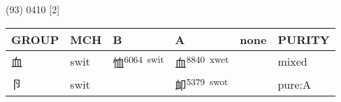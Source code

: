 \documentclass[14pt,a4paper]{scrartcl}
\begin{document}
(93) 0410 {[}2{]}

\begin{longtable}[c]{@{}llllll@{}}
\toprule
\begin{minipage}[b]{0.14\columnwidth}\raggedright\strut
GROUP
\strut\end{minipage} &
\begin{minipage}[b]{0.14\columnwidth}\raggedright\strut
MCH
\strut\end{minipage} &
\begin{minipage}[b]{0.14\columnwidth}\raggedright\strut
B
\strut\end{minipage} &
\begin{minipage}[b]{0.14\columnwidth}\raggedright\strut
A
\strut\end{minipage} &
\begin{minipage}[b]{0.14\columnwidth}\raggedright\strut
none
\strut\end{minipage} &
\begin{minipage}[b]{0.14\columnwidth}\raggedright\strut
PURITY
\strut\end{minipage}\tabularnewline
\midrule
\endhead
\begin{minipage}[t]{0.14\columnwidth}\raggedright\strut
血
\strut\end{minipage} &
\begin{minipage}[t]{0.14\columnwidth}\raggedright\strut
swit
\strut\end{minipage} &
\begin{minipage}[t]{0.14\columnwidth}\raggedright\strut
恤\textsuperscript{6064~swit}
\strut\end{minipage} &
\begin{minipage}[t]{0.14\columnwidth}\raggedright\strut
血\textsuperscript{8840~xwet}
\strut\end{minipage} &
\begin{minipage}[t]{0.14\columnwidth}\raggedright\strut
\strut\end{minipage} &
\begin{minipage}[t]{0.14\columnwidth}\raggedright\strut
mixed
\strut\end{minipage}\tabularnewline
\begin{minipage}[t]{0.14\columnwidth}\raggedright\strut
卪
\strut\end{minipage} &
\begin{minipage}[t]{0.14\columnwidth}\raggedright\strut
swit
\strut\end{minipage} &
\begin{minipage}[t]{0.14\columnwidth}\raggedright\strut
\strut\end{minipage} &
\begin{minipage}[t]{0.14\columnwidth}\raggedright\strut
卹\textsuperscript{5379~swot}
\strut\end{minipage} &
\begin{minipage}[t]{0.14\columnwidth}\raggedright\strut
\strut\end{minipage} &
\begin{minipage}[t]{0.14\columnwidth}\raggedright\strut
pure:A
\strut\end{minipage}\tabularnewline
\bottomrule
\end{longtable}
\end{document}
